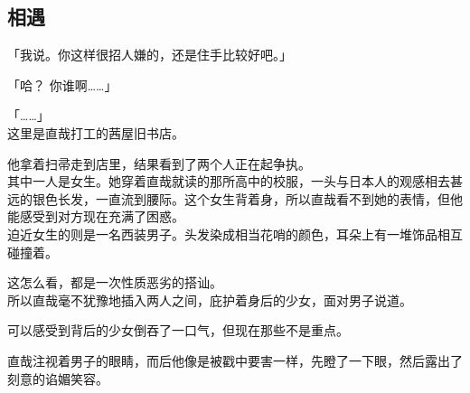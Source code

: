 \subsection{相遇}

「我说。你这样很招人嫌的，还是住手比较好吧。」

「哈？ 你谁啊……」

「……」\\

这里是直哉打工的茜屋旧书店。

他拿着扫帚走到店里，结果看到了两个人正在起争执。\\

其中一人是女生。她穿着直哉就读的那所高中的校服，一头与日本人的观感相去甚远的银色长发，一直流到腰际。这个女生背着身，所以直哉看不到她的表情，但他能感受到对方现在充满了困惑。\\

迫近女生的则是一名西装男子。头发染成相当花哨的颜色，耳朵上有一堆饰品相互碰撞着。

这怎么看，都是一次性质恶劣的搭讪。\\

所以直哉毫不犹豫地插入两人之间，庇护着身后的少女，面对男子说道。

可以感受到背后的少女倒吞了一口气，但现在那些不是重点。

直哉注视着男子的眼睛，而后他像是被戳中要害一样，先瞪了一下眼，然后露出了刻意的谄媚笑容。\\

